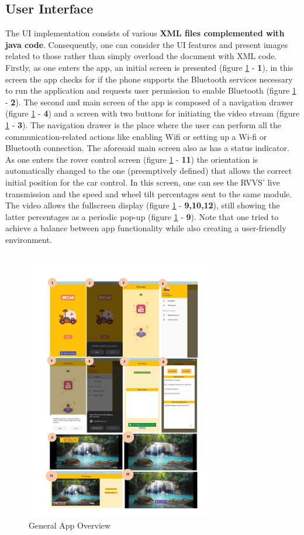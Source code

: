 \subsection{User Interface}%
\label{sec:ui-implementation}
%
The UI implementation consists of various \textbf{XML files complemented with java code}. Consequently, one can consider the UI features and present images related to those rather than simply overload the document with XML code. Firstly, as one enters the app, an initial screen is presented (figure \ref{fig:app-overview} - \textbf{1}), in this screen the app checks for if the phone supports the Bluetooth services necessary to run the application and requests user permission to enable Bluetooth (figure \ref{fig:app-overview} - \textbf{2}). The second and main screen of the app is composed of a navigation drawer (figure \ref{fig:app-overview} - \textbf{4}) and a screen with two buttons for initiating the video stream (figure \ref{fig:app-overview} - \textbf{3}). The navigation drawer is the place where the user can perform all the communication-related actions like enabling Wifi or setting up a Wi-fi or Bluetooth connection. The aforesaid main screen also as has a status indicator. As one enters the rover control screen (figure \ref{fig:app-overview} - \textbf{11}) the orientation is automatically changed to the one (preemptively defined) that allows the correct initial position for the car control. In this screen, one can see the RVVS' live transmission and the speed and wheel tilt percentages sent to the same module. The video allows the fullscreen display (figure \ref{fig:app-overview} - \textbf{9,10,12}), still showing the latter percentages as a periodic pop-up (figure \ref{fig:app-overview} - \textbf{9}). Note that one tried to achieve a balance between app functionality while also creating a user-friendly environment.
%
\begin{figure}[!ht]
\centering
\includegraphics[width=0.75\textwidth]{img/general-app-overview.jpg}
\caption{\label{fig:app-overview}General App Overview}
\end{figure}
%